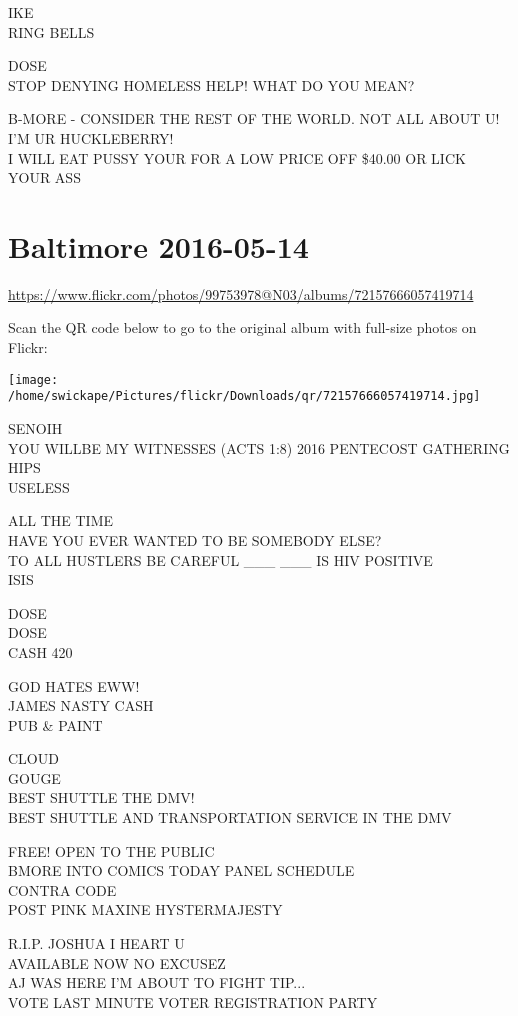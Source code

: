 \documentclass[10pt,letterpaper]{article}
\begin{document}
IKE\\
RING BELLS

DOSE\\
STOP DENYING HOMELESS HELP!  WHAT DO YOU MEAN?

B{-}MORE {-} CONSIDER THE REST OF THE WORLD.  NOT ALL ABOUT U!  I'M UR HUCKLEBERRY!\\
I WILL EAT PUSSY YOUR FOR A LOW PRICE OFF \$40.00 OR LICK YOUR ASS


\section*{Baltimore 2016-05-14}

\url{https://www.flickr.com/photos/99753978@N03/albums/72157666057419714}

Scan the QR code below to go to the original album with full-size photos on Flickr:

\texttt{[image: /home/swickape/Pictures/flickr/Downloads/qr/72157666057419714.jpg]}


SENOIH\\
YOU WILLBE MY WITNESSES (ACTS 1:8) 2016 PENTECOST GATHERING\\
HIPS\\
USELESS

ALL THE TIME\\
HAVE YOU EVER WANTED TO BE SOMEBODY ELSE?\\
TO ALL HUSTLERS BE CAREFUL \_\_\_ \_\_\_ IS HIV POSITIVE\\
ISIS

DOSE\\
DOSE\\
CASH 420

GOD HATES EWW!\\
JAMES NASTY CASH\\
PUB \& PAINT

CLOUD\\
GOUGE\\
BEST SHUTTLE THE DMV!\\
BEST SHUTTLE AND TRANSPORTATION SERVICE IN THE DMV

FREE!  OPEN TO THE PUBLIC\\
BMORE INTO COMICS TODAY PANEL SCHEDULE\\
CONTRA CODE\\
POST PINK MAXINE HYSTERMAJESTY

R.I.P. JOSHUA I HEART U\\
AVAILABLE NOW NO EXCUSEZ\\
AJ WAS HERE I'M ABOUT TO FIGHT TIP...\\
VOTE LAST MINUTE VOTER REGISTRATION PARTY
\end{document}
